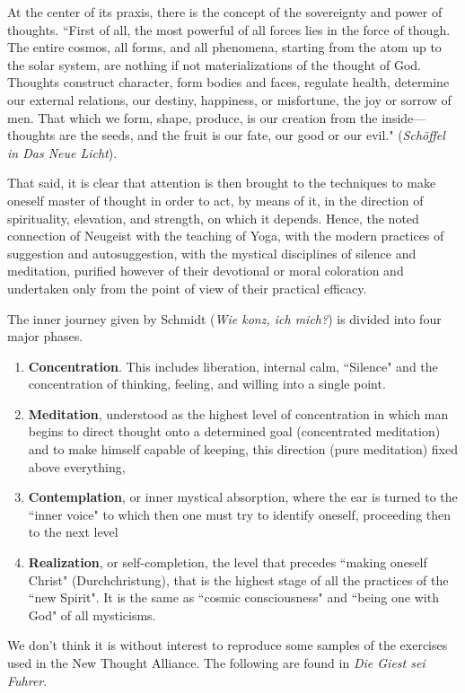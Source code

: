 At the center of its praxis, there is the concept of the sovereignty and power of thoughts. ``First of all, the most powerful of all forces lies in the force of though. The entire cosmos, all forms, and all phenomena, starting from the atom up to the solar system, are nothing if not materializations of the thought of God. Thoughts construct character, form bodies and faces, regulate health, determine our external relations, our destiny, happiness, or misfortune, the joy or sorrow of men. That which we form, shape, produce, is our creation from the inside—thoughts are the seeds, and the fruit is our fate, our good or our evil." (\textit{Schöffel in Das Neue Licht}).

That said, it is clear that attention is then brought to the techniques to make oneself master of thought in order to act, by means of it, in the direction of spirituality, elevation, and strength, on which it depends. Hence, the noted connection of Neugeist with the teaching of Yoga, with the modern practices of suggestion and autosuggestion, with the mystical disciplines of silence and meditation, purified however of their devotional or moral coloration and undertaken only from the point of view of their practical efficacy.

The inner journey given by Schmidt (\textit{Wie konz, ich mich?}) is divided into four major phases.

\begin{enumerate}
\item \textbf{Concentration}. This includes liberation, internal calm, ``Silence" and the concentration of thinking, feeling, and willing into a single point. 
\item \textbf{Meditation}, understood as the highest level of concentration in which man begins to direct thought onto a determined goal (concentrated meditation) and to make himself capable of keeping, this direction (pure meditation) fixed above everything, 
\item \textbf{Contemplation}, or inner mystical absorption, where the ear is turned to the ``inner voice" to which then one must try to identify oneself, proceeding then to the next level 
\item \textbf{Realization}, or self-completion, the level that precedes ``making oneself Christ" (Durchchristung), that is the highest stage of all the practices of the ``new Spirit". It is the same as ``cosmic consciousness" and ``being one with God" of all mysticisms. 
\end{enumerate}
We don't think it is without interest to reproduce some samples of the exercises used in the New Thought Alliance. The following are found in \textit{Die Giest sei Fuhrer}.

